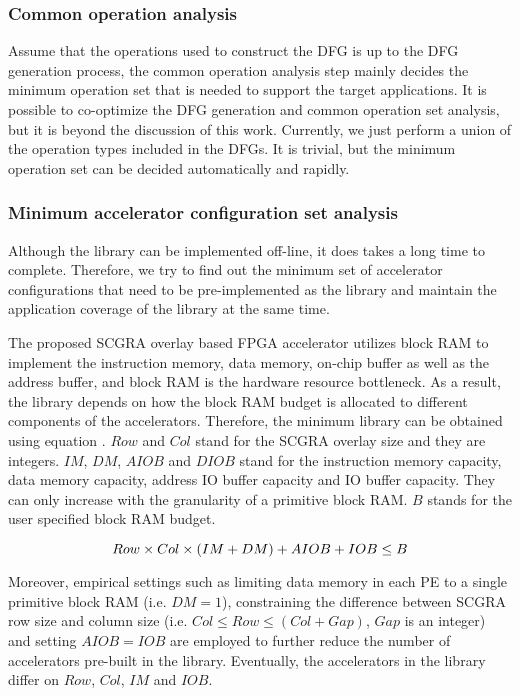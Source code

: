 \subsubsection{Common operation analysis}
Assume that the operations used to construct the DFG is up to the DFG generation process, the common
operation analysis step mainly decides the minimum operation set that is needed to support the
target applications. It is possible to co-optimize the DFG generation and common operation set
analysis, but it is beyond the discussion of this work. Currently, we just perform a union of the
operation types included in the DFGs. It is trivial, but the minimum operation set can be decided
automatically and rapidly.

\subsubsection{Minimum accelerator configuration set analysis}
Although the library can be implemented off-line, it does takes a long time to complete.
Therefore, we try to find out the minimum set of accelerator configurations that need to be
pre-implemented as the library and maintain the application coverage of the library at the same
time. 

The proposed SCGRA overlay based FPGA accelerator utilizes
block RAM to implement the instruction memory, data memory, on-chip buffer as well as the address
buffer, and block RAM is the hardware resource bottleneck. As a result, the library depends on how
the block RAM budget is allocated to different components of the accelerators. Therefore, the
minimum library can be obtained using equation . $Row$ and $Col$ stand for the SCGRA
overlay size and they are integers. $IM$, $DM$, $AIOB$ and $DIOB$ stand for the instruction memory capacity,
data memory capacity, address IO buffer capacity and IO buffer capacity. They can only increase with the granularity of a primitive block RAM. $B$ stands for the user specified block RAM budget. 

\begin{equation} \label{eq:lib-gen}
    \footnotesize
    Row \times Col \times(IM + DM) + AIOB + IOB \leq B
\end{equation}

Moreover, empirical settings such as limiting data memory in each PE to a single primitive block RAM
(i.e. $DM = 1$), constraining the difference between SCGRA row size and column size (i.e. $Col \leq
Row \leq (Col + Gap)$, $Gap$ is an integer) and setting $AIOB = IOB$ are employed to further reduce the number of
accelerators pre-built in the library. Eventually, the accelerators in the library differ on $Row$,
$Col$, $IM$ and $IOB$. 

